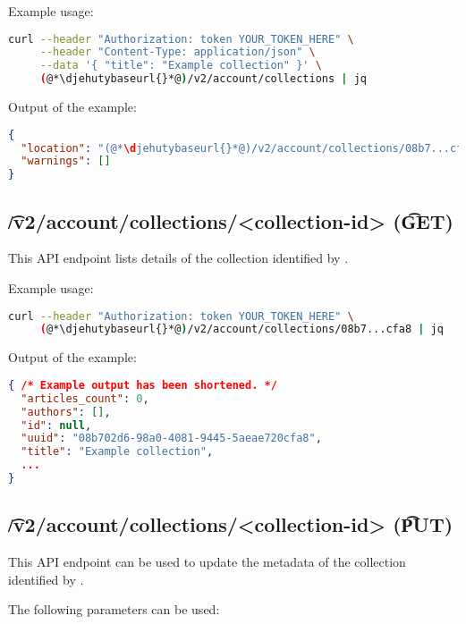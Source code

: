   Example usage:
\begin{lstlisting}[language=bash]
curl --header "Authorization: token YOUR_TOKEN_HERE" \
     --header "Content-Type: application/json" \
     --data '{ "title": "Example collection" }' \
     (@*\djehutybaseurl{}*@)/v2/account/collections | jq
\end{lstlisting}

  Output of the example:
\begin{lstlisting}[language=JSON]
{
  "location": "(@*\djehutybaseurl{}*@)/v2/account/collections/08b7...cfa8",
  "warnings": []
}
\end{lstlisting}

\subsection{\t{/v2/account/collections/<collection-id>} (\t{GET})}
\label{sec:v2-collections-collection-id}

  This API endpoint lists details of the collection identified by .

  Example usage:
\begin{lstlisting}[language=bash]
curl --header "Authorization: token YOUR_TOKEN_HERE" \
     (@*\djehutybaseurl{}*@)/v2/account/collections/08b7...cfa8 | jq
\end{lstlisting}

  Output of the example:
\begin{lstlisting}[language=JSON]
{ /* Example output has been shortened. */
  "articles_count": 0,
  "authors": [],
  "id": null,
  "uuid": "08b702d6-98a0-4081-9445-5aeae720cfa8",
  "title": "Example collection",
  ...
}
\end{lstlisting}

\subsection{\t{/v2/account/collections/<collection-id>} (\t{PUT})}

  This API endpoint can be used to update the metadata of the collection
  identified by .

  The following parameters can be used:


